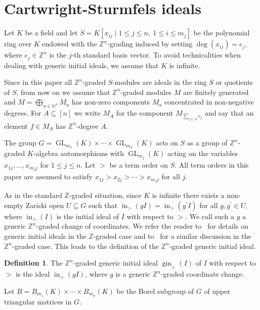 \documentclass{amsart}
\theoremstyle{definition}
\newtheorem{definition}[theorem]{Definition}
\numberwithin{equation}{section}
\def\GL{\operatorname{GL}}
\def\gin{\operatorname{gin}}
\def\ini{\operatorname{in}}
\def\NN{\mathbb{N}}
\def\ZZ{\mathbb{Z}}
\begin{document}
\section{Cartwright-Sturmfels ideals }
\label{section:CS}

Let $K$ be a field and let
\(S=K[x_{ij}\mid 1\leq j\leq n,\ 1\leq i\leq m_j]\)
 be the polynomial ring over $K$ endowed with the $\ZZ^n$-grading induced by setting $\deg(x_{ij})=e_j$, where $e_j\in\ZZ^n$ is the $j$-th standard basis vector. To avoid technicalities when dealing with
 generic initial ideals, we assume that $K$ is infinite.

Since in this paper all $\ZZ^n$-graded 
$S$-modules are ideals in the ring $S$ or quotients of $S$, from now 
on we assume that $\ZZ^n$-graded modules $M$
are finitely generated and
$M = \bigoplus_{a \in \NN^n} M_a$ 
has non-zero components $M_a$ concentrated in
non-negative degrees. For $A\subseteq [n]$ we write
$M_A$ for the component
$M_{\sum_{j\in A} e_j}$ and say that an element $f \in M_A$
has $\ZZ^n$-degree $A$.

The group $G=\GL_{m_1}(K)\times\cdots\times\GL_{m_n}(K)$ acts  on $S$ as a group of $\ZZ^n$-graded $K$-algebra automorphisms with $\GL_{m_j}(K)$ acting on the variables
$x_{1j},\ldots, x_{m_jj}$ for $1 \leq j \leq n$.  
Let $>$ be a term order on $S$. All term orders in this paper are assumed to satisfy  $x_{1j}>x_{2j}> \cdots >x_{m_j j}$ for all $j$.

As in the standard $\ZZ$-graded situation, since $K$ is infinite there exists a non-empty Zariski open $U\subseteq G$ such that $\ini_>(gI)=\ini_>(g^\prime I)$ for all $g,g^\prime\in U$, where $\ini_>(I)$ is the 
initial ideal of $I$ with respect to $>$. 
We call such a $g$ a generic $\ZZ^n$-graded change of coordinates. We refer the   reader to~\cite[Theorem~15.23]{E} for details on generic initial ideals in the $\ZZ$-graded case and to~\cite[Section~1]{ACD} for a similar discussion in the $\ZZ^n$-graded case.
This leads to the definition of the $\ZZ^n$-graded generic initial ideal. 

\begin{definition}
The $\ZZ^n$-graded generic initial ideal $\gin_>(I)$ of $I$ with respect to $>$ is the ideal 
$\ini_>(gI)$, where $g$ is a generic $\ZZ^n$-graded coordinate change.  
\end{definition}

Let $B=B_{m_1}(K)\times \cdots  \times B_{m_n}(K)$ be the Borel subgroup of $G$ of upper triangular matrices in $G$. 
\end{document}
